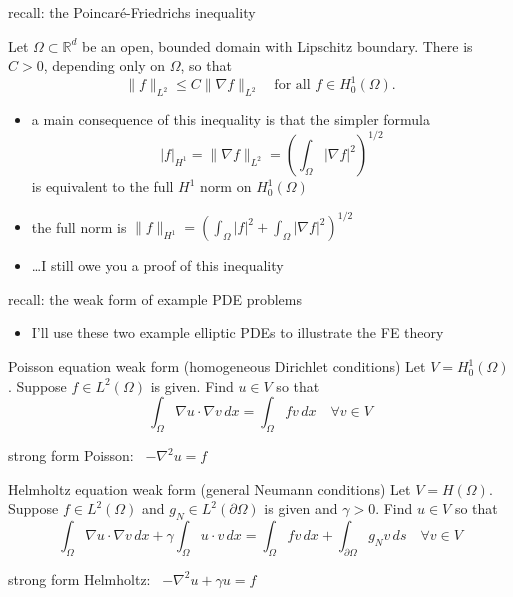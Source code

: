 \documentclass[10pt,
               svgnames,
               hyperref={colorlinks,
                         citecolor=DeepPink4,
                         linkcolor=FireBrick,
                         urlcolor=blue},
               usepdftitle=false]{beamer}
\newcommand{\RR}{\mathbb{R}}
\newcommand{\grad}{\nabla}
\begin{document}
\begin{frame}{recall: the Poincar\'e-Friedrichs inequality}

\begin{theorem}
Let $\Omega\subset \RR^d$ be an open, bounded domain with Lipschitz boundary.  There is $C>0$, depending only on $\Omega$, so that
	$$\|f\|_{L^2} \le C \|\grad f\|_{L^2} \quad \text{for all } f\in H_0^1(\Omega).$$
\end{theorem}

\begin{itemize}
\item a main consequence of this inequality is that the simpler formula
	$$|f|_{H^1} = \|\grad f\|_{L^2} = \left(\int_\Omega |\grad f|^2\right)^{1/2}$$
is \alert{equivalent to the full $H^1$ norm on $H_0^1(\Omega)$}
\item the full norm is $\|f\|_{H^1} = \left(\int_\Omega |f|^2 + \int_\Omega |\grad f|^2\right)^{1/2}$
\item \dots I still owe you a proof of this inequality
\end{itemize}
\end{frame}


\begin{frame}{recall: the weak form of example PDE problems}

\begin{itemize}
\item I'll use these two example elliptic PDEs to illustrate the FE theory
\end{itemize}

\begin{block}{Poisson equation weak form (homogeneous Dirichlet conditions)}
Let $V=H_0^1(\Omega)$.  Suppose $f\in L^2(\Omega)$ is given.  Find $u\in V$ so that
    $$\int_\Omega \grad u \cdot \grad v\,dx = \int_\Omega f v\,dx \quad \forall v\in V$$
\end{block}

strong form Poisson: \, $\boxed{-\grad^2 u = f}$

\begin{block}{Helmholtz equation weak form (general Neumann conditions)}
Let $V=H(\Omega)$.  Suppose $f\in L^2(\Omega)$ and $g_N\in L^2(\partial\Omega)$ is given and $\gamma>0$.  Find $u\in V$ so that
    $$\int_\Omega \grad u \cdot \grad v\,dx + \gamma \int_\Omega u \cdot v\,dx = \int_\Omega f v\,dx + \int_{\partial \Omega} g_N v\,ds \quad \forall v\in V$$
\end{block}

strong form Helmholtz: \, $\boxed{-\grad^2 u + \gamma u = f}$
\end{frame}
\end{document}
